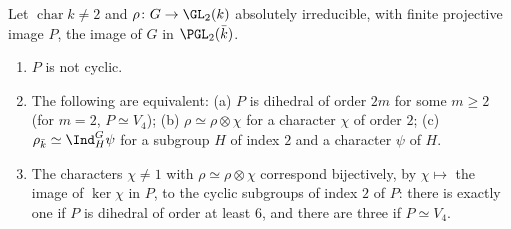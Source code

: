 \begin{proposition}\label{prop:reps:dihedral}
Let $\operatorname{char}k\ne2$ and $\rho\colon G\to\GL_2(k)$ absolutely irreducible, with finite projective image $P$, the image of $G$ in $\PGL_2(\bar k)$.
\begin{enumerate}[label=(\roman*)]
\item $P$ is not cyclic.
\item The following are equivalent: (a) $P$ is dihedral of order $2m$ for some $m\ge2$ (for $m=2$, $P\simeq V_4$); (b) $\rho\simeq\rho\otimes\chi$ for a
character $\chi$ of order $2$; (c) $\rho_{\bar k}\simeq\Ind_H^G\psi$ for a subgroup $H$ of index $2$ and a character $\psi$ of $H$.
\item The characters $\chi\ne1$ with $\rho\simeq\rho\otimes\chi$ correspond bijectively, by $\chi\mapsto$ the image of $\ker\chi$ in $P$, to the cyclic
subgroups of index $2$ of $P$: there is exactly one if $P$ is dihedral of order at least $6$, and there are three if $P\simeq V_4$.
\end{enumerate}
\end{proposition}

